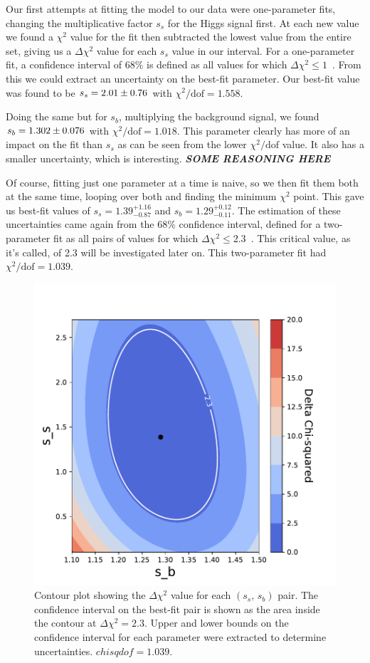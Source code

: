\documentclass[11pt]{article}
\newcommand{\chisq}{\chi^2}
\newcommand{\chisqdof}{\chi^2/\mathrm{dof}}
\numberwithin{equation}{section}
\numberwithin{figure}{section}
\numberwithin{table}{section}
\begin{document}
Our first attempts at fitting the model to our data were one-parameter fits, changing the multiplicative factor $s_s$ for the Higgs signal first. At each new value we found a $\chisq$ value for the fit then subtracted the lowest value from the entire set, giving us a $\Delta\chisq$ value for each $s_s$ value in our interval. For a one-parameter fit, a confidence interval of $68\%$ is defined as all values for which $\Delta\chisq\leq1$~\cite{XRay_energy_spectra}. From this we could extract an uncertainty on the best-fit parameter. Our best-fit value was found to be $s_s=\num{2.01 \pm0.76}$ with $\chisqdof=1.558$.

Doing the same but for $s_b$, multiplying the background signal, we found $s_b=\num{1.302\pm0.076}$ with $\chisqdof=1.018$. This parameter clearly has more of an impact on the fit than $s_s$ as can be seen from the lower $\chisqdof$ value. It also has a smaller uncertainty, which is interesting. \textbf{\textit{SOME REASONING HERE}}

Of course, fitting just one parameter at a time is naive, so we then fit them both at the same time, looping over both and finding the minimum $\chisq$ point. This gave us best-fit values of $s_s=1.39^{+1.16}_{-0.87}$ and $s_b=1.29^{+0.12}_{-0.11}$. The estimation of these uncertainties came again from the $68\%$ confidence interval, defined for a two-parameter fit as all pairs of values for which $\Delta\chisq\leq2.3$~\cite{XRay_energy_spectra}. This critical value, as it's called, of 2.3 will be investigated later on. This two-parameter fit had $\chisqdof=1.039$.

\begin{figure}[h]
    \begin{center}
        \includegraphics[width=.6\textwidth]{Plots/two_fit_contour.pdf}
        \caption{Contour plot showing the $\Delta\chisq$ value for each $(s_s,\,s_b)$ pair. The confidence interval on the best-fit pair is shown as the area inside the contour at $\Delta\chisq=2.3$. Upper and lower bounds on the confidence interval for each parameter were extracted to determine uncertainties. $chisqdof=1.039$.}
        \label{fig:two_fit_contour}
    \end{center}
\end{figure}





\newpage
\printbibliography
\end{document}
